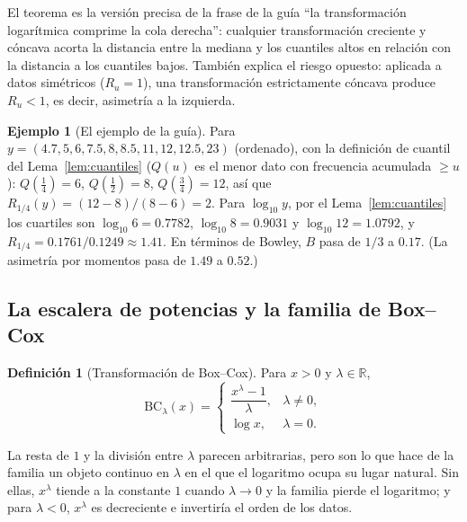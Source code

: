 \documentclass[11pt]{article}
\theoremstyle{definition}
\newtheorem{definicion}[teorema]{Definición}
\newtheorem{ejemplo}[teorema]{Ejemplo}
\theoremstyle{remark}
\newcommand{\R}{\mathbb{R}}
\newcommand{\BC}{\mathrm{BC}}
\begin{document}
\noindent El teorema es la versión precisa de la frase de la guía ``la transformación logarítmica comprime la cola derecha'': cualquier transformación creciente y cóncava acorta la distancia entre la mediana y los cuantiles altos en relación con la distancia a los cuantiles bajos. También explica el riesgo opuesto: aplicada a datos simétricos ($R_u=1$), una transformación estrictamente cóncava produce $R_u<1$, es decir, asimetría a la izquierda.

\begin{ejemplo}[El ejemplo de la guía]\label{ej:bowley}
\noindent Para $y=(4.7,5,6,7.5,8,8.5,11,12,12.5,23)$ (ordenado), con la definición de cuantil del Lema~\ref{lem:cuantiles} ($Q(u)$ es el menor dato con frecuencia acumulada $\ge u$): $Q(\frac14)=6$, $Q(\frac12)=8$, $Q(\frac34)=12$, así que $R_{1/4}(y)=(12-8)/(8-6)=2$. Para $\log_{10}y$, por el Lema~\ref{lem:cuantiles} los cuartiles son $\log_{10}6=0.7782$, $\log_{10}8=0.9031$ y $\log_{10}12=1.0792$, y $R_{1/4}=0.1761/0.1249\approx1.41$. En términos de Bowley, $B$ pasa de $1/3$ a $0.17$. (La asimetría por momentos pasa de $1.49$ a $0.52$.)
\end{ejemplo}

\subsection{La escalera de potencias y la familia de Box--Cox}\label{sec:boxcox}

\begin{definicion}[Transformación de Box--Cox]\label{def:boxcox}
\noindent Para $x>0$ y $\lambda\in\R$,
\[
\BC_\lambda(x)=\begin{cases}\dfrac{x^\lambda-1}{\lambda},&\lambda\ne0,\\[2mm] \log x,&\lambda=0.\end{cases}
\]
\end{definicion}

\noindent La resta de $1$ y la división entre $\lambda$ parecen arbitrarias, pero son lo que hace de la familia un objeto continuo en $\lambda$ en el que el logaritmo ocupa su lugar natural. Sin ellas, $x^\lambda$ tiende a la constante $1$ cuando $\lambda\to0$ y la familia pierde el logaritmo; y para $\lambda<0$, $x^\lambda$ es decreciente e invertiría el orden de los datos.
\end{document}
